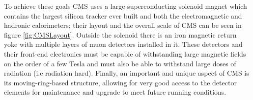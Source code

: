 To achieve these goals CMS uses a large superconducting solenoid magnet which contains
the largest silicon tracker ever built and both the electromagnetic and hadronic calorimeters;
their layout and the overall scale of CMS can be seen in figure \ref{fig:CMSLayout}.
Outside the solenoid there is an iron magnetic return yoke with multiple layers of muon
detectors installed in it.
These detectors and their front-end electronics must be capable of withstanding
large magnetic fields on the order of a few Tesla and
must also be able to withstand large doses of radiation (i.e radiation hard). 
Finally, an important and unique aspect of CMS is its moving-ring-based structure,
allowing for very good access to the detector elements for 
maintenance and upgrade to meet future running conditions.
